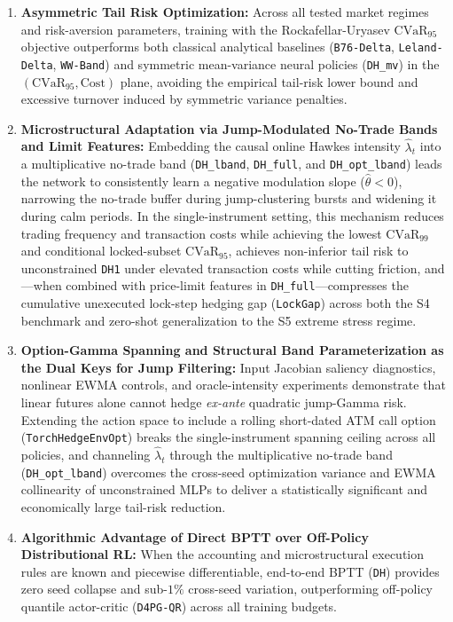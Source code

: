 \documentclass[11pt,a4paper]{article}
\begin{document}
\begin{enumerate}
  \item \textbf{Asymmetric Tail Risk Optimization:} Across all tested market regimes and risk-aversion parameters, training with the Rockafellar-Uryasev $\text{CVaR}_{95}$ objective outperforms both classical analytical baselines (\texttt{B76-Delta}, \texttt{Leland-Delta}, \texttt{WW-Band}) and symmetric mean-variance neural policies (\texttt{DH\_mv}) in the $(\text{CVaR}_{95}, \text{Cost})$ plane, avoiding the empirical tail-risk lower bound and excessive turnover induced by symmetric variance penalties.
  \item \textbf{Microstructural Adaptation via Jump-Modulated No-Trade Bands and Limit Features:} Embedding the causal online Hawkes intensity $\hat{\lambda}_t$ into a multiplicative no-trade band (\texttt{DH\_lband}, \texttt{DH\_full}, and \texttt{DH\_opt\_lband}) leads the network to consistently learn a negative modulation slope ($\hat{\theta} < 0$), narrowing the no-trade buffer during jump-clustering bursts and widening it during calm periods. In the single-instrument setting, this mechanism reduces trading frequency and transaction costs while achieving the lowest $\text{CVaR}_{99}$ and conditional locked-subset $\text{CVaR}_{95}$, achieves non-inferior tail risk to unconstrained \texttt{DH1} under elevated transaction costs while cutting friction, and---when combined with price-limit features in \texttt{DH\_full}---compresses the cumulative unexecuted lock-step hedging gap (\texttt{LockGap}) across both the S4 benchmark and zero-shot generalization to the S5 extreme stress regime.
  \item \textbf{Option-Gamma Spanning and Structural Band Parameterization as the Dual Keys for Jump Filtering:} Input Jacobian saliency diagnostics, nonlinear EWMA controls, and oracle-intensity experiments demonstrate that linear futures alone cannot hedge \emph{ex-ante} quadratic jump-Gamma risk. Extending the action space to include a rolling short-dated ATM call option (\texttt{TorchHedgeEnvOpt}) breaks the single-instrument spanning ceiling across all policies, and channeling $\hat{\lambda}_t$ through the multiplicative no-trade band (\texttt{DH\_opt\_lband}) overcomes the cross-seed optimization variance and EWMA collinearity of unconstrained MLPs to deliver a statistically significant and economically large tail-risk reduction.
  \item \textbf{Algorithmic Advantage of Direct BPTT over Off-Policy Distributional RL:} When the accounting and microstructural execution rules are known and piecewise differentiable, end-to-end BPTT (\texttt{DH}) provides zero seed collapse and sub-$1\%$ cross-seed variation, outperforming off-policy quantile actor-critic (\texttt{D4PG-QR}) across all training budgets.
\end{enumerate}
\end{document}
